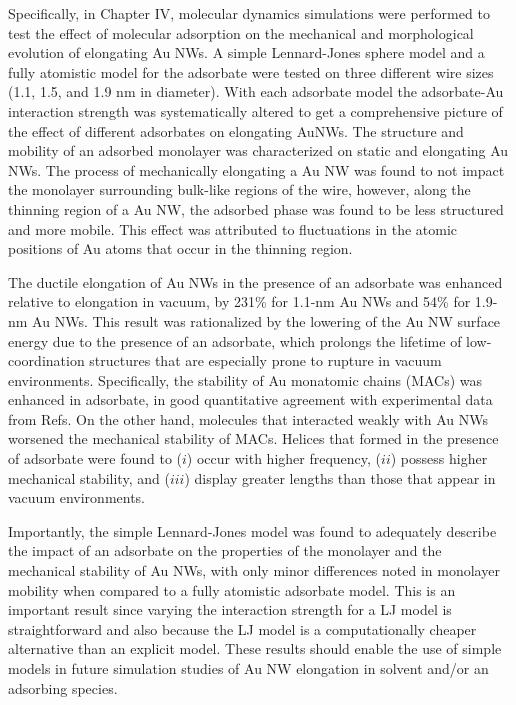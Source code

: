 \documentclass[10pt]{report}  %
\begin{document}
Specifically, in Chapter IV, molecular dynamics simulations were performed to test the effect of molecular adsorption on the mechanical and morphological evolution of elongating Au NWs.  A simple Lennard-Jones sphere model and a fully atomistic model for the adsorbate were tested on three different wire sizes (1.1, 1.5, and 1.9 nm in diameter).  With each adsorbate model the adsorbate-Au interaction strength was systematically altered to get a comprehensive picture of the effect of different adsorbates on elongating AuNWs.  The structure and mobility of an adsorbed monolayer was characterized on static and elongating Au NWs. The process of mechanically elongating a Au NW was found to not impact the monolayer surrounding bulk-like regions of the wire, however, along the thinning region of a Au NW, the adsorbed phase was found to be less structured and more mobile.  This effect was attributed to fluctuations in the atomic positions of Au atoms that occur in the thinning region. 

The ductile elongation of Au NWs in the presence of an adsorbate was enhanced relative to elongation in vacuum, by 231\% for 1.1-nm Au NWs and 54\% for 1.9-nm Au NWs.  This result was rationalized by the lowering of the Au NW surface energy due to the presence of an adsorbate, which prolongs the lifetime of low-coordination structures that are especially prone to rupture in vacuum environments. Specifically, the stability of Au monatomic chains (MACs) was enhanced in adsorbate, in good quantitative agreement with experimental data from Refs. \cite{He:2002,Tsutsui_nl:2009}  On the other hand, molecules that interacted weakly with Au NWs worsened the mechanical stability of MACs.  Helices that formed in the presence of adsorbate were found to ($i$) occur with higher frequency, ($ii$) possess higher mechanical stability, and ($iii$) display greater lengths than those that appear in vacuum environments.  

Importantly, the simple Lennard-Jones model was found to adequately describe the impact of an adsorbate on the properties of the monolayer and the mechanical stability of Au NWs, with only minor differences noted in monolayer mobility when compared to a fully atomistic adsorbate model.  This is an important result since varying the interaction strength for a LJ model is straightforward and also because the LJ model is a computationally cheaper alternative than an explicit model.  These results should enable the use of simple models in future simulation studies of Au NW elongation in solvent and/or an adsorbing species. 
\end{document}
